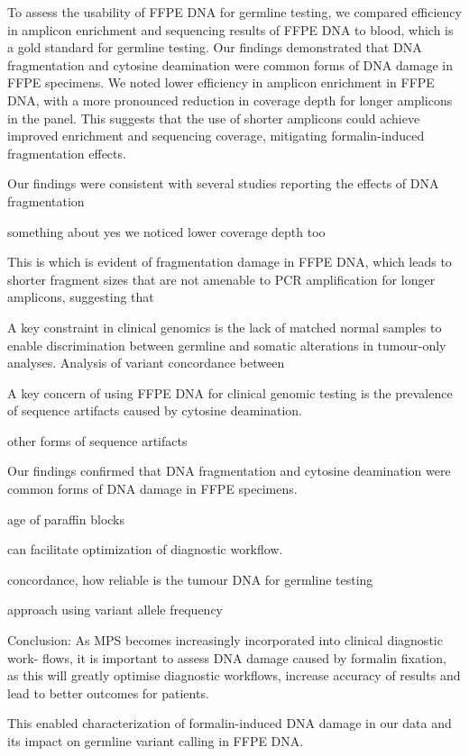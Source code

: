 To assess the usability of FFPE DNA for germline testing, we compared efficiency in amplicon enrichment and sequencing results of FFPE DNA to blood, which is a gold standard for germline testing. Our findings demonstrated that DNA fragmentation and cytosine deamination were common forms of DNA damage in FFPE specimens. We noted lower efficiency in amplicon enrichment in FFPE DNA, with a more pronounced reduction in coverage depth for longer amplicons in the panel. This suggests that the use of shorter amplicons could achieve improved enrichment and sequencing coverage, mitigating formalin-induced fragmentation effects.

Our findings were consistent with several studies reporting the effects of DNA fragmentation

something about yes we noticed lower coverage depth too

This is which is evident of fragmentation damage in FFPE DNA, which leads to shorter fragment sizes that are not amenable to PCR amplification for longer amplicons, suggesting that

A key constraint in clinical genomics is the lack of matched normal samples to enable discrimination between germline and somatic alterations in tumour-only analyses. Analysis of variant concordance between



A key concern of using FFPE DNA for clinical genomic testing is the prevalence of sequence artifacts caused by cytosine deamination.

other forms of sequence artifacts

Our findings confirmed that DNA fragmentation and cytosine deamination were common forms of DNA damage in FFPE specimens.

age of paraffin blocks

can facilitate optimization of diagnostic workflow.

concordance, how reliable is the tumour DNA for germline testing

approach using variant allele frequency

Conclusion: As MPS becomes increasingly incorporated into clinical diagnostic work- flows, it is important to assess DNA damage caused by formalin fixation, as this will greatly optimise diagnostic workflows, increase accuracy of results and lead to better outcomes for patients.

This enabled characterization of formalin-induced DNA damage in our data and its impact on germline variant calling in FFPE DNA.

